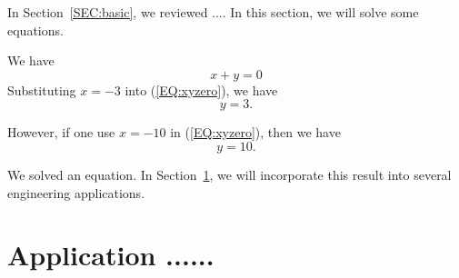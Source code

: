 \documentclass[11pt,a4paper]{article}
\begin{document}
In Section~\ref{SEC:basic}, we reviewed .... In this section, we will solve some equations.

We have 
\begin{equation}
x + y = 0
\label{EQ:xyzero}
\end{equation}
Substituting $x=-3$ into (\ref{EQ:xyzero}), we have 
\[
y=3.
\]

However, if one use $x=-10$ in (\ref{EQ:xyzero}), then we have 
\[
y=10.
\]


We solved an equation. In Section~\ref{SEC:Application}, we will incorporate this result into several engineering applications.

\section{Application ......} \label{SEC:Application}




  
% 




\end{document}
